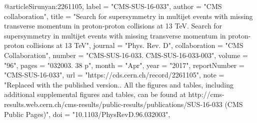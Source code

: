 @article{Sirunyan:2261105,
      label          = "CMS-SUS-16-033",
      author        = "{CMS collaboration}",
      title         = "{Search for supersymmetry in multijet events with missing
                       transverse momentum in proton-proton collisions at 13 TeV.
                       Search for supersymmetry in multijet events with missing
                       transverse momentum in proton-proton collisions at 13 TeV}",
      journal       = "Phys. Rev. D",
      collaboration = "CMS Collaboration",
      number        = "CMS-SUS-16-033. CMS-SUS-16-033-003",
      volume        = "96",
      pages         = "032003. 38 p",
      month         = "Apr",
      year          = "2017",
      reportNumber  = "CMS-SUS-16-033",
      url           = "https://cds.cern.ch/record/2261105",
      note          = "Replaced with the published version.. All the figures and
                       tables, including additional supplemental figures and
                       tables, can be found at
                       http://cms-results.web.cern.ch/cms-results/public-results/publications/SUS-16-033
                       (CMS Public Pages)",
      doi           = "10.1103/PhysRevD.96.032003",
}

